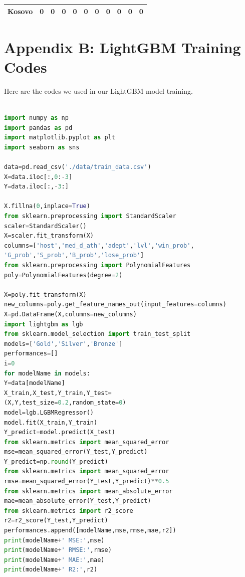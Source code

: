 \documentclass[12pt]{article}  %
\begin{document}
\begin{subappendices}
\begin{longtable}{|l|c|c|c|c|c|c|c|c|c|c|}
	\hline
	Kosovo                                                         & 0                                                                      & 0                                                                      & 0                                                                      & 0                                                                      & 0                                                                      & 0                                                                      & 0                         & 0                           & 0                           & 0                           \\
	\hline
\end{longtable}



\section{Appendix B: LightGBM Training Codes}
Here are the codes we used in our LightGBM model training.




\begin{lstlisting}[language=Python, name={LightGBM.py}]

import numpy as np
import pandas as pd
import matplotlib.pyplot as plt
import seaborn as sns

data=pd.read_csv('./data/train_data.csv')
X=data.iloc[:,0:-3]
Y=data.iloc[:,-3:]

X.fillna(0,inplace=True)
from sklearn.preprocessing import StandardScaler
scaler=StandardScaler()
X=scaler.fit_transform(X)
columns=['host','med_d_ath','adept','lvl','win_prob',
'G_prob','S_prob','B_prob','lose_prob']
from sklearn.preprocessing import PolynomialFeatures
poly=PolynomialFeatures(degree=2)

X=poly.fit_transform(X)
new_columns=poly.get_feature_names_out(input_features=columns)
X=pd.DataFrame(X,columns=new_columns)
import lightgbm as lgb
from sklearn.model_selection import train_test_split
models=['Gold','Silver','Bronze']
performances=[]
i=0
for modelName in models:
Y=data[modelName]
X_train,X_test,Y_train,Y_test=
(X,Y,test_size=0.2,random_state=0)
model=lgb.LGBMRegressor()
model.fit(X_train,Y_train)
Y_predict=model.predict(X_test)
from sklearn.metrics import mean_squared_error
mse=mean_squared_error(Y_test,Y_predict)
Y_predict=np.round(Y_predict)
from sklearn.metrics import mean_squared_error
rmse=mean_squared_error(Y_test,Y_predict)**0.5
from sklearn.metrics import mean_absolute_error
mae=mean_absolute_error(Y_test,Y_predict)
from sklearn.metrics import r2_score
r2=r2_score(Y_test,Y_predict)
performances.append([modelName,mse,rmse,mae,r2])
print(modelName+' MSE:',mse)
print(modelName+' RMSE:',rmse)
print(modelName+' MAE:',mae)
print(modelName+' R2:',r2)


\end{lstlisting}
\end{subappendices}
\end{document}
